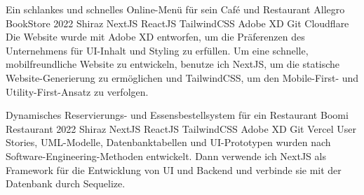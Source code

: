 

\begin{cventries}

\cventry
{Ein schlankes und schnelles Online-Menü für sein Café und Restaurant} %
{Allegro BookStore} %
{2022} %
{Shiraz} %
{
  NextJS \mitdiv ReactJS \mitdiv TailwindCSS \mitdiv Adobe XD \mitdiv Git \mitdiv Cloudflare
  \newline
  Die Website wurde mit Adobe XD entworfen, um die Präferenzen des Unternehmens für UI-Inhalt und Styling zu erfüllen.
  Um eine schnelle, mobilfreundliche Website zu entwickeln, benutze ich NextJS, um die statische Website-Generierung zu ermöglichen
  und TailwindCSS, um den Mobile-First- und Utility-First-Ansatz zu verfolgen.
}

\cventry
{Dynamisches Reservierungs- und Essensbestellsystem für ein Restaurant} %
{Boomi Restaurant} %
{2022} %
{Shiraz} %
{
  NextJS \mitdiv ReactJS \mitdiv TailwindCSS \mitdiv Adobe XD \mitdiv Git \mitdiv Vercel
  \newline
  User Stories, UML-Modelle, Datenbanktabellen und UI-Prototypen wurden
  nach Software-Engineering-Methoden entwickelt. Dann verwende ich NextJS als Framework für die Entwicklung von UI
  und Backend und verbinde sie mit der Datenbank durch Sequelize.
}


\end{cventries}
